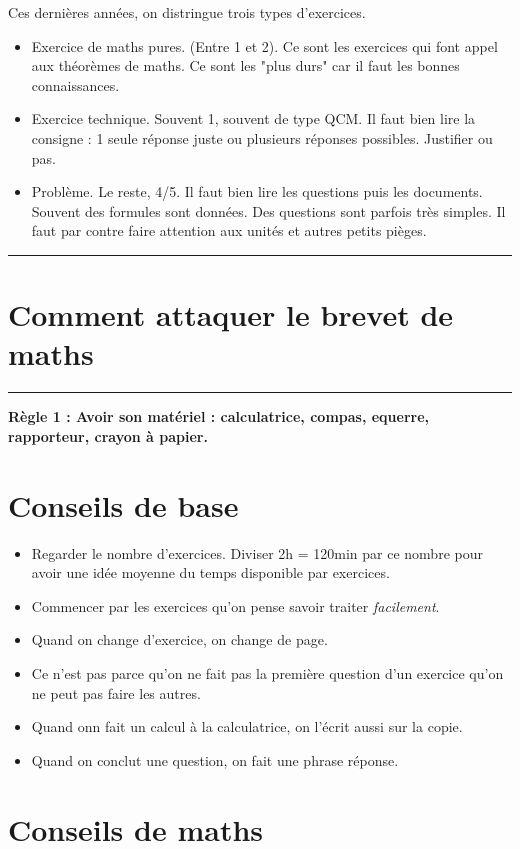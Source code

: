 \documentclass[11pt]{article}
\newcommand{\horrule}[1]{\rule{\linewidth}{#1}} %
\begin{document}
Ces dernières années, on distringue trois types d'exercices.
\begin{itemize}
\item Exercice de maths pures. (Entre 1 et 2). Ce sont les exercices qui font appel aux théorèmes de maths. Ce sont les "plus durs" car il faut les bonnes connaissances.
\item Exercice technique. Souvent 1, souvent de type QCM. Il faut bien lire la consigne : 1 seule réponse juste ou plusieurs réponses possibles. Justifier ou pas. 
\item Problème. Le reste, 4/5. Il faut bien lire les questions puis les documents. Souvent des formules sont données. Des questions sont parfois très simples. Il faut par contre faire attention aux unités et autres petits pièges.                                                                                          
\end{itemize}

\horrule{2px} 

\section*{Comment attaquer le brevet de maths}
\horrule{2px} 
\textbf{Règle 1 : Avoir son matériel : calculatrice, compas, equerre, rapporteur, crayon à papier.}


\section*{Conseils de base}

\begin{itemize}
\item Regarder le nombre d'exercices. Diviser 2h = 120min par ce nombre pour avoir une idée moyenne du temps disponible par exercices.
\item Commencer par les exercices qu'on pense savoir traiter \textit{facilement}. 
\item Quand on change d'exercice, on change de page.
\item Ce n'est pas parce qu'on ne fait pas la première question d'un exercice qu'on ne peut pas faire les autres.
\item Quand onn fait un calcul à la calculatrice, on l'écrit aussi sur la copie.
\item Quand on conclut une question, on fait une phrase réponse.
\end{itemize}

\section*{Conseils de maths}
\end{document}
